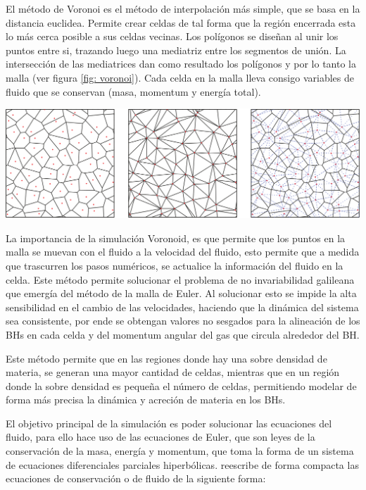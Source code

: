 El método de Voronoi es el método de interpolación más simple, que se basa en la distancia euclidea. Permite crear celdas de tal forma que la región encerrada esta lo más cerca posible a sus celdas vecinas. Los polígonos se diseñan al unir los puntos entre si, trazando luego una mediatriz entre los segmentos de unión. La intersección de las mediatrices dan como resultado los polígonos y por lo tanto la malla (ver figura \ref{fig: voronoi}). Cada celda en la malla lleva consigo variables de fluido que se conservan (masa, momentum y energía total).
%
\begin{center}
\includegraphics[scale=.35]{./figures/5_Algoritmo_Modelacion/voronoi.png}
\label{fig: voronoi}
\end{center}
%
La importancia de la simulación Voronoid, es que permite que los puntos en la malla se muevan con el fluido a la velocidad del fluido, esto permite que a medida que trascurren los pasos numéricos, se actualice la información del fluido en la celda. Este método permite solucionar el problema de no invariabilidad galileana que emergía del método de la malla de Euler. Al solucionar esto se impide la alta sensibilidad en el cambio de las velocidades, haciendo que la dinámica del sistema sea consistente, por ende se obtengan valores no sesgados para la alineación de los BHs en cada celda y del momentum angular del gas que circula alrededor del BH. 

Este método permite que en las regiones donde hay una sobre densidad de materia, se generan una mayor cantidad de celdas, mientras que en un región donde la sobre densidad es pequeña el número de celdas, permitiendo modelar de forma más precisa la dinámica y acreción de materia en los BHs.

El objetivo principal de la simulación es poder solucionar las ecuaciones del fluido, para ello hace uso de las ecuaciones de Euler, que son leyes de la conservación de la masa, energía y momentum, que toma la forma de un sistema de ecuaciones diferenciales parciales hiperbólicas. \cite{springel2010} reescribe de forma compacta las ecuaciones de conservación o de fluido de la siguiente forma:

